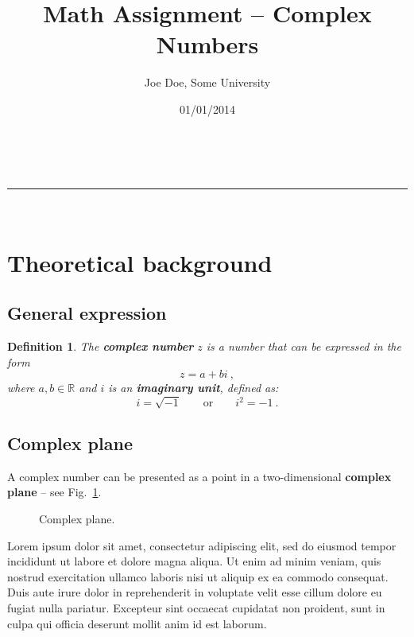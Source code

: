 \documentclass[a4paper,11pt]{article}
\makeatletter
\newcommand{\linia}{\rule{\linewidth}{0.5pt}}
\theoremstyle{mytheor}
\newtheorem{defi}{Definition}
\renewcommand{\maketitle}{
\begin{center}
\vspace{2ex}
{\huge \textsc{\@title}}
\vspace{1ex}
\\
\linia\\
\@author \hfill \@date
\vspace{4ex}
\end{center}
}
\makeatother
\begin{document}
\title{Math Assignment -- Complex Numbers}

\author{Joe Doe, Some University}

\date{01/01/2014}

\maketitle

\section{Theoretical background}

\subsection{General expression}

\begin{defi}
The \textbf{complex number} $z$ is a number that can be expressed in the form
\begin{equation}
z = a + bi\ ,
\label{r1}
\end{equation}
where $a, b \in \mathbb{R}$ and $i$ is an \textbf{imaginary unit}, defined as:
$$i=\sqrt{-1} \qquad \text{or} \qquad i^2= -1\ .$$
\end{defi}

\subsection{Complex plane}

A complex number can be presented as a point in a two-dimensional \textbf{complex plane} -- see Fig.~\ref{fig:cmpl}.


\begin{figure}[!htb]
\centering
{}
\caption{\label{fig:cmpl}Complex plane.}
\end{figure}

Lorem ipsum dolor sit amet, consectetur adipiscing elit, sed do eiusmod tempor incididunt ut labore et dolore magna aliqua. Ut enim ad minim veniam, quis nostrud exercitation ullamco laboris nisi ut aliquip ex ea commodo consequat. Duis aute irure dolor in reprehenderit in voluptate velit esse cillum dolore eu fugiat nulla pariatur. Excepteur sint occaecat cupidatat non proident, sunt in culpa qui officia deserunt mollit anim id est laborum.
\end{document}
